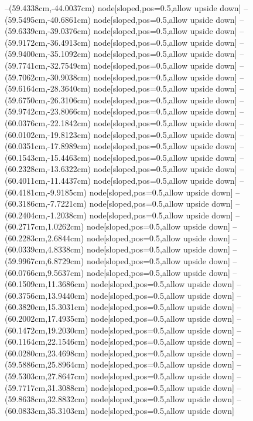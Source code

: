 --(59.4338cm,-44.0037cm) node[sloped,pos=0.5,allow upside down]{\ArrowIn}
--(59.5495cm,-40.6861cm) node[sloped,pos=0.5,allow upside down]{\ArrowIn}
--(59.6339cm,-39.0376cm) node[sloped,pos=0.5,allow upside down]{\ArrowIn}
--(59.9172cm,-36.4913cm) node[sloped,pos=0.5,allow upside down]{\ArrowIn}
--(59.9400cm,-35.1092cm) node[sloped,pos=0.5,allow upside down]{\ArrowIn}
--(59.7741cm,-32.7549cm) node[sloped,pos=0.5,allow upside down]{\ArrowIn}
--(59.7062cm,-30.9038cm) node[sloped,pos=0.5,allow upside down]{\ArrowIn}
--(59.6164cm,-28.3640cm) node[sloped,pos=0.5,allow upside down]{\ArrowIn}
--(59.6750cm,-26.3106cm) node[sloped,pos=0.5,allow upside down]{\ArrowIn}
--(59.9742cm,-23.8066cm) node[sloped,pos=0.5,allow upside down]{\ArrowIn}
--(60.0376cm,-22.1842cm) node[sloped,pos=0.5,allow upside down]{\ArrowIn}
--(60.0102cm,-19.8123cm) node[sloped,pos=0.5,allow upside down]{\ArrowIn}
--(60.0351cm,-17.8989cm) node[sloped,pos=0.5,allow upside down]{\ArrowIn}
--(60.1543cm,-15.4463cm) node[sloped,pos=0.5,allow upside down]{\ArrowIn}
--(60.2328cm,-13.6322cm) node[sloped,pos=0.5,allow upside down]{\ArrowIn}
--(60.4011cm,-11.4437cm) node[sloped,pos=0.5,allow upside down]{\ArrowIn}
--(60.4181cm,-9.9185cm) node[sloped,pos=0.5,allow upside down]{\ArrowIn}
--(60.3186cm,-7.7221cm) node[sloped,pos=0.5,allow upside down]{\ArrowIn}
--(60.2404cm,-1.2038cm) node[sloped,pos=0.5,allow upside down]{\ArrowIn}
--(60.2717cm,1.0262cm) node[sloped,pos=0.5,allow upside down]{\ArrowIn}
--(60.2283cm,2.6844cm) node[sloped,pos=0.5,allow upside down]{\ArrowIn}
--(60.0339cm,4.8338cm) node[sloped,pos=0.5,allow upside down]{\ArrowIn}
--(59.9967cm,6.8729cm) node[sloped,pos=0.5,allow upside down]{\ArrowIn}
--(60.0766cm,9.5637cm) node[sloped,pos=0.5,allow upside down]{\ArrowIn}
--(60.1509cm,11.3686cm) node[sloped,pos=0.5,allow upside down]{\ArrowIn}
--(60.3756cm,13.9440cm) node[sloped,pos=0.5,allow upside down]{\ArrowIn}
--(60.3820cm,15.3031cm) node[sloped,pos=0.5,allow upside down]{\ArrowIn}
--(60.2002cm,17.4935cm) node[sloped,pos=0.5,allow upside down]{\ArrowIn}
--(60.1472cm,19.2030cm) node[sloped,pos=0.5,allow upside down]{\ArrowIn}
--(60.1164cm,22.1546cm) node[sloped,pos=0.5,allow upside down]{\ArrowIn}
--(60.0280cm,23.4698cm) node[sloped,pos=0.5,allow upside down]{\ArrowIn}
--(59.5886cm,25.8964cm) node[sloped,pos=0.5,allow upside down]{\ArrowIn}
--(59.5303cm,27.8647cm) node[sloped,pos=0.5,allow upside down]{\ArrowIn}
--(59.7717cm,31.3088cm) node[sloped,pos=0.5,allow upside down]{\ArrowIn}
--(59.8638cm,32.8832cm) node[sloped,pos=0.5,allow upside down]{\ArrowIn}
--(60.0833cm,35.3103cm) node[sloped,pos=0.5,allow upside down]{\ArrowIn}
